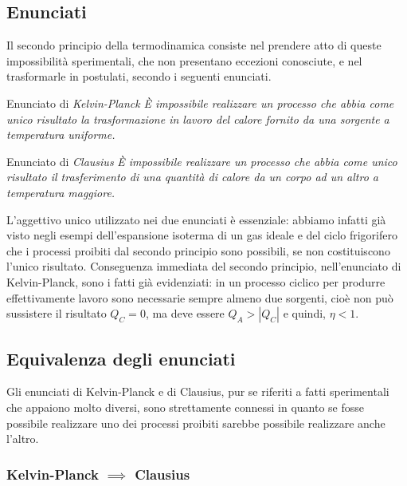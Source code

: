 \documentclass[class=book, crop=false, oneside, 12pt]{standalone}
\begin{document}
\subsection{Enunciati}

Il secondo principio della termodinamica consiste nel prendere atto di queste impossibilità sperimentali, che non presentano eccezioni conosciute, e  nel trasformarle in postulati, secondo i seguenti enunciati. 

Enunciato di \emph{Kelvin-Planck}\newline
\emph{È impossibile realizzare un processo che abbia come unico risultato la trasformazione in lavoro del calore fornito da una sorgente a temperatura uniforme.}

Enunciato di \emph{Clausius}\newline
\emph{È impossibile realizzare un processo che abbia come unico risultato il trasferimento di una quantità di calore da un corpo ad un altro a temperatura maggiore. }

L'aggettivo unico utilizzato nei due enunciati è essenziale: abbiamo infatti già visto negli esempi dell'espansione isoterma di un gas ideale e del ciclo frigorifero che i processi proibiti dal secondo principio sono possibili, se non costituiscono l'unico risultato. 
Conseguenza immediata del secondo principio, nell'enunciato di Kelvin-Planck, sono i fatti già evidenziati: in un processo ciclico per produrre effettivamente lavoro sono necessarie sempre almeno due sorgenti, cioè non può sussistere il risultato \(Q_C = 0\), ma deve essere \(Q_A > |Q_C|\) e quindi, \(\eta < 1\).

\subsection{Equivalenza degli enunciati}

Gli enunciati di Kelvin-Planck e di Clausius, pur se riferiti a fatti sperimentali che appaiono molto diversi, sono strettamente connessi in quanto se fosse possibile realizzare uno dei processi proibiti sarebbe possibile realizzare anche l'altro.

\subsubsection*{Kelvin-Planck \(\implies\) Clausius}
\end{document}
